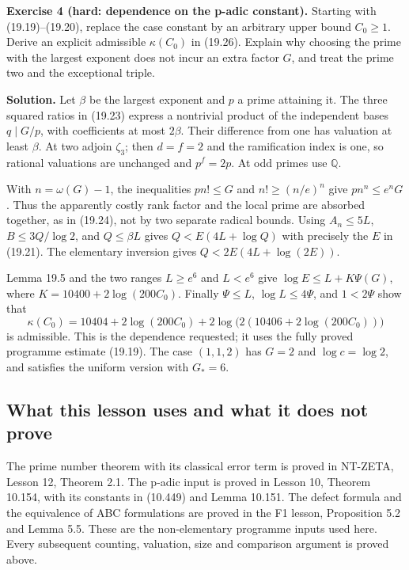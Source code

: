\documentclass[
  11pt,
  a4paper,
]{article}
\begin{document}
\textbf{Exercise 4 (hard: dependence on the p-adic constant).} Starting
with (19.19)--(19.20), replace the case constant by an arbitrary upper
bound \(C_0\ge1\). Derive an explicit admissible \(\kappa(C_0)\) in
(19.26). Explain why choosing the prime with the largest exponent does
not incur an extra factor \(G\), and treat the prime two and the
exceptional triple.

\textbf{Solution.} Let \(\beta\) be the largest exponent and \(p\) a
prime attaining it. The three squared ratios in (19.23) express a
nontrivial product of the independent bases \(q\mid G/p\), with
coefficients at most \(2\beta\). Their difference from one has valuation
at least \(\beta\). At two adjoin \(\zeta_3\); then \(d=f=2\) and the
ramification index is one, so rational valuations are unchanged and
\(p^f=2p\). At odd primes use \(\mathbb Q\).

With \(n=\omega(G)-1\), the inequalities \(pn!\le G\) and
\(n!\ge(n/e)^n\) give \(pn^n\le e^nG\). Thus the apparently costly rank
factor and the local prime are absorbed together, as in (19.24), not by
two separate radical bounds. Using \(A_n\le5L\), \(B\le3Q/\log2\), and
\(Q\le\beta L\) gives \(Q<E(4L+\log Q)\) with precisely the \(E\) in
(19.21). The elementary inversion gives \(Q<2E(4L+\log(2E))\).

Lemma 19.5 and the two ranges \(L\ge e^6\) and \(L<e^6\) give
\(\log E\le L+K\Psi(G)\), where \(K=10400+2\log(200C_0)\). Finally
\(\Psi\le L\), \(\log L\le4\Psi\), and \(1<2\Psi\) show that \[
 \kappa(C_0)=10404+2\log(200C_0)
 +2\log\bigl(2(10406+2\log(200C_0))\bigr)
\] is admissible. This is the dependence requested; it uses the fully
proved programme estimate (19.19). The case \((1,1,2)\) has \(G=2\) and
\(\log c=\log2\), and satisfies the uniform version with \(G_* =6\).

\subsection{What this lesson uses and what it does not
prove}\label{what-this-lesson-uses-and-what-it-does-not-prove}

The prime number theorem with its classical error term is proved in
NT-ZETA, Lesson 12, Theorem 2.1. The p-adic input is proved in Lesson
10, Theorem 10.154, with its constants in (10.449) and Lemma 10.151. The
defect formula and the equivalence of ABC formulations are proved in the
F1 lesson, Proposition 5.2 and Lemma 5.5. These are the non-elementary
programme inputs used here. Every subsequent counting, valuation, size
and comparison argument is proved above.
\end{document}
